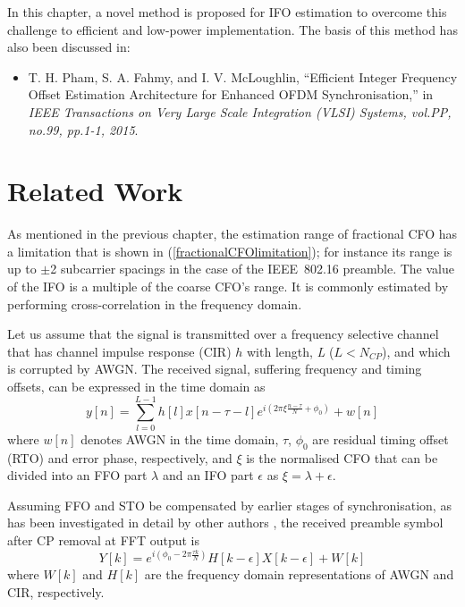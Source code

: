 In this chapter, a novel method is proposed for IFO estimation to overcome this challenge to efficient and low-power implementation. The basis of this method has also been discussed in:
\begin{itemize}
\item T. H. Pham, S. A. Fahmy, and I. V. McLoughlin, ``Efficient Integer Frequency Offset Estimation Architecture for Enhanced OFDM Synchronisation,'' in \textit{IEEE Transactions on Very Large Scale Integration (VLSI) Systems, vol.PP, no.99, pp.1-1, 2015}.
\end{itemize}

\section{Related Work}
As mentioned in the previous chapter, the estimation range of  fractional CFO has a limitation that is shown in (\ref{fractionalCFOlimitation}); for instance its range is up to $\pm$2 subcarrier spacings in the case of the IEEE~802.16 preamble. The value of the IFO is a multiple of the coarse CFO's range.
It is commonly estimated by performing cross-correlation \cite{Bang2001,Kim2008} in the frequency domain.

Let us assume that the signal is transmitted over a frequency selective channel that has channel impulse response (CIR) $h$ with length, \emph{L} ($L<N_{CP}$), and which is corrupted by AWGN.
The received signal, suffering frequency and timing offsets, can be expressed in the time domain as
\begin{equation}
\label{xnfull}
y[n] = \sum_{l=0}^{L-1} h[l]x[n-\tau-l] e^{i(2\pi \xi \frac{n-\tau}{N} + \phi_0)} + w[n]
\end{equation}
where $w[n]$ denotes AWGN in the time domain, $\tau$, $\phi_0$ are residual timing offset (RTO) and error phase, respectively, and $\xi$ is the normalised CFO that can be divided into an FFO part $\lambda$ and an IFO part $\epsilon$ as $\xi=\lambda+\epsilon$.

Assuming FFO and STO be compensated by earlier stages of synchronisation, as has been investigated in detail by other authors \cite{Kim2008,Pham2014}, the received preamble symbol after CP removal at FFT output is
\begin{equation}
\label{xnrec}
Y[k] =  e^{i(\phi_0-2\pi \frac{\tau k}{N})} H[k-\epsilon] X[k-\epsilon] + W[k]
\end{equation}
where $W[k]$ and $H[k]$ are the frequency domain representations of AWGN and CIR, respectively.

